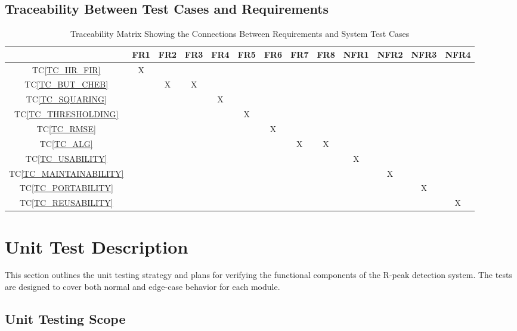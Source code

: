 \documentclass[12pt, titlepage]{article}
\newcommand{\tcref}[1]{TC\ref{#1}} \newcounter{testcasenum}
\begin{document}
\newpage

\subsection{Traceability Between Test Cases and Requirements}


\begin{table}[htbp!]
  \centering
  \begin{tabular}{|c|c|c|c|c|c|c|c|c|c|c|c|c|}
  \hline
    & FR1& FR2& FR3& FR4& FR5& FR6& FR7& FR8& NFR1& NFR2& NFR3& NFR4 \\
  \hline
  \tcref{TC_IIR_FIR}            & X& & & & & & & & & & & \\ \hline
  \tcref{TC_BUT_CHEB}           & & X& X& & & & & & & & & \\ \hline
  \tcref{TC_SQUARING}           & & & & X& & & & & & & & \\ \hline
  \tcref{TC_THRESHOLDING}       & & & & & X& & & & & & & \\ \hline
  \tcref{TC_RMSE}               & & & & & & X& & & & & & \\ \hline
  \tcref{TC_ALG}                & & & & & & & X& X& & & & \\ \hline
  \tcref{TC_USABILITY}          & & & & & & & & & X& & & \\ \hline
  \tcref{TC_MAINTAINABILITY}    & & & & & & & & & & X& & \\ \hline
  \tcref{TC_PORTABILITY}        & & & & & & & & & & & X& \\ \hline
  \tcref{TC_REUSABILITY}        & & & & & & & & & & & & X\\
  \hline
  \end{tabular}
  \caption{Traceability Matrix Showing the Connections Between Requirements and System Test Cases}
  \label{Table:tc_trace}
\end{table}

\section{Unit Test Description}

This section outlines the unit testing strategy and plans for verifying the
functional components of the R-peak detection system. The tests are designed to
cover both normal and edge-case behavior for each module.

\subsection{Unit Testing Scope}
\end{document}
